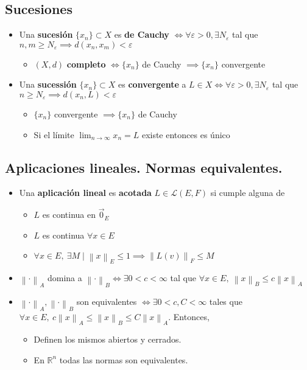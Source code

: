 \documentclass[a4paper,twocolumn]{extarticle}
\newcommand{\R}{\mathbb{R}}
\newcommand{\norma}[1]{\left\lVert#1\right\rVert}
\newcommand{\lacot}[1]{\mathcal{L}(#1)}
\begin{document}
\subsection{Sucesiones}
\begin{itemize}
	\item Una \textbf{sucesión} $\{x_n\} \subset X$ es \textbf{de Cauchy} $\iff \forall \varepsilon > 0, \exists N_\varepsilon$ tal que $n, m \geq N_\varepsilon \implies d(x_n, x_m) < \varepsilon$
	\begin{itemize}
		\item $(X, d)$ \textbf{completo} $\iff \{x_n\}$ de Cauchy $\implies \{x_n\}$ convergente
	\end{itemize}
	\item Una \textbf{sucessión} $\{x_n\} \subset X$ es \textbf{convergente} a $L \in X \iff \forall \varepsilon > 0, \exists N_\varepsilon$ tal que $n \geq N_\varepsilon \implies d(x_n, L) < \varepsilon$
	\begin{itemize}
		\item $\{x_n\}$ convergente $\implies \{x_n\}$ de Cauchy
		\item Si el límite $\lim_{n \to \infty} x_n = L$ existe entonces es único
	\end{itemize}
\end{itemize}

\subsection{Aplicaciones lineales. Normas equivalentes.}
\begin{itemize}
	\item Una \textbf{aplicación lineal} es \textbf{acotada} $L \in \lacot{E, F}$ si cumple alguna de
	\begin{itemize}
		\item $L$ es continua en $\vec{0}_E$
		\item $L$ es continua $\forall x \in E$
		\item $\forall x \in E,\ \exists M \mid \norma{x}_E \leq 1 \implies \norma{L(v)}_F \leq M$
	\end{itemize}
	\item $\norma{\cdot}_A$ domina a $\norma{\cdot}_B \iff \exists 0 < c < \infty$ tal que $\forall x \in E,\ \norma{x}_B \leq c\norma{x}_A$
	\item $\norma{\cdot}_A, \norma{\cdot}_B$ son equivalentes $\iff \exists 0 < c, C < \infty$ tales que $\forall x \in E,\ c\norma{x}_A \leq \norma{x}_B \leq C\norma{x}_A$. Entonces,
	\begin{itemize}
		\item Definen los mismos abiertos y cerrados.
		\item En $\R^n$ todas las normas son equivalentes.
	\end{itemize}
	
\end{itemize}
\end{document}

